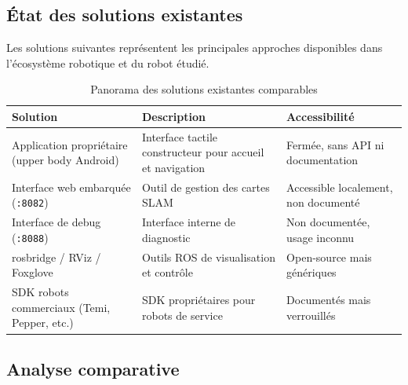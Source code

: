 \newpage

\subsection{État des solutions existantes}
\label{subsec:solutions_existantes}

Les solutions suivantes représentent les principales approches disponibles
dans l'écosystème robotique et du robot étudié.

\begin{table}[H]
\centering
\begin{tabular}{|p{}|p{}|p{}|}
\hline
\textbf{Solution} & \textbf{Description} & \textbf{Accessibilité} \\
\hline
Application propriétaire (upper body Android) &
Interface tactile constructeur pour accueil et navigation &
Fermée, sans API ni documentation \\
\hline
Interface web embarquée (\texttt{:8082}) &
Outil de gestion des cartes SLAM &
Accessible localement, non documenté \\
\hline
Interface de debug (\texttt{:8088}) &
Interface interne de diagnostic &
Non documentée, usage inconnu \\
\hline
rosbridge / RViz / Foxglove &
Outils ROS de visualisation et contrôle &
Open-source mais génériques \\
\hline
SDK robots commerciaux (Temi, Pepper, etc.) &
SDK propriétaires pour robots de service &
Documentés mais verrouillés \\
\hline
\end{tabular}
\caption{Panorama des solutions existantes comparables}
\label{tab:solutions_existantes}
\end{table}

\subsection{Analyse comparative}
\label{subsec:benchmark}

